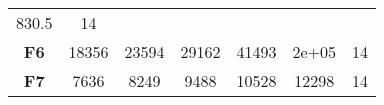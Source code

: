 \documentclass[12pt,a4paper]{article}
\begin{document}
\begin{longtable}[c]{@{}ccccccc@{}}
\begin{minipage}[t]{0.11\columnwidth}\centering\strut
830.5
\strut\end{minipage} &
\begin{minipage}[t]{0.07\columnwidth}\centering\strut
14
\strut\end{minipage}\tabularnewline
\begin{minipage}[t]{0.11\columnwidth}\centering\strut
\textbf{F6}
\strut\end{minipage} &
\begin{minipage}[t]{0.08\columnwidth}\centering\strut
18356
\strut\end{minipage} &
\begin{minipage}[t]{0.08\columnwidth}\centering\strut
23594
\strut\end{minipage} &
\begin{minipage}[t]{0.09\columnwidth}\centering\strut
29162
\strut\end{minipage} &
\begin{minipage}[t]{0.10\columnwidth}\centering\strut
41493
\strut\end{minipage} &
\begin{minipage}[t]{0.11\columnwidth}\centering\strut
2e+05
\strut\end{minipage} &
\begin{minipage}[t]{0.07\columnwidth}\centering\strut
14
\strut\end{minipage}\tabularnewline
\begin{minipage}[t]{0.11\columnwidth}\centering\strut
\textbf{F7}
\strut\end{minipage} &
\begin{minipage}[t]{0.08\columnwidth}\centering\strut
7636
\strut\end{minipage} &
\begin{minipage}[t]{0.08\columnwidth}\centering\strut
8249
\strut\end{minipage} &
\begin{minipage}[t]{0.09\columnwidth}\centering\strut
9488
\strut\end{minipage} &
\begin{minipage}[t]{0.10\columnwidth}\centering\strut
10528
\strut\end{minipage} &
\begin{minipage}[t]{0.11\columnwidth}\centering\strut
12298
\strut\end{minipage} &
\begin{minipage}[t]{0.07\columnwidth}\centering\strut
14
\strut\end{minipage}\tabularnewline

\end{longtable}
\end{document}
